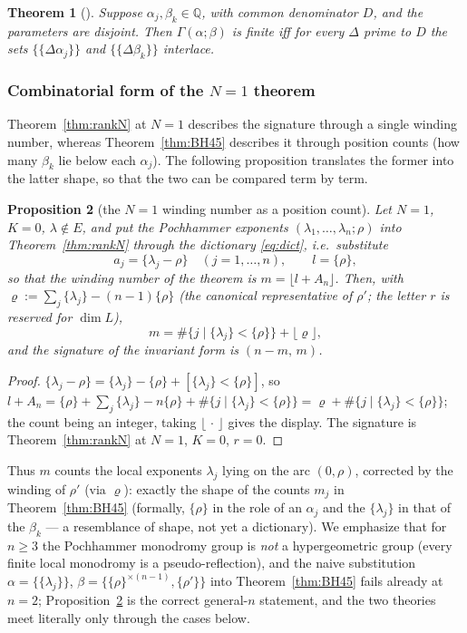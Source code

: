 \documentclass[11pt]{article}
\newtheorem{theorem}{Theorem}[section]
\newtheorem{proposition}[theorem]{Proposition}
\theoremstyle{definition}
\newcommand{\frc}[1]{\{#1\}}
\begin{document}
\begin{theorem}[{\cite[Thm.~4.8]{BH}}]\label{thm:BH48}
Suppose $\alpha_j,\beta_k\in\mathbb Q$, with common denominator $D$, and the
parameters are disjoint. Then $\Gamma(\alpha;\beta)$ is finite
iff for every $\Delta$ prime to $D$ the sets $\{\frc{\Delta\alpha_j}\}$ and
$\{\frc{\Delta\beta_k}\}$ interlace.
\end{theorem}


\subsubsection{Combinatorial form of the $N=1$ theorem}
Theorem~\ref{thm:rankN} at $N=1$ describes the signature through a
single winding number, whereas Theorem~\ref{thm:BH45} describes it
through position counts (how many $\beta_k$ lie below each
$\alpha_j$). The following proposition translates the former into the
latter shape, so that the two can be compared term by term.

\begin{proposition}[the $N=1$ winding number as a position count]
\label{prop:kappa}
Let $N=1$, $K=0$, $\lambda\notin E$, and put the Pochhammer exponents
$(\lambda_1,\dots,\lambda_n;\rho)$ into Theorem~\ref{thm:rankN}
through the dictionary \eqref{eq:dict}, i.e.\ substitute
\[
a_j=\frc{\lambda_j-\rho}\quad(j=1,\dots,n),\qquad l=\frc\rho ,
\]
so that the winding number of the theorem is $m=\lfloor l+A_n\rfloor$.
Then, with $\varrho:=\sum_j\frc{\lambda_j}-(n-1)\frc{\rho}$ (the
canonical representative of $\rho'$; the letter $r$ is reserved for
$\dim L$),
\[
m=\#\{j\mid\frc{\lambda_j}<\frc{\rho}\}+\lfloor \varrho\rfloor ,
\]
and the signature of the invariant form is $(n-m,\,m)$.
\end{proposition}

\begin{proof}
$\frc{\lambda_j-\rho}=\frc{\lambda_j}-\frc{\rho}+[\frc{\lambda_j}<\frc\rho]$,
so $l+A_n=\frc\rho+\sum_j\frc{\lambda_j}-n\frc\rho
+\#\{j\mid\frc{\lambda_j}<\frc{\rho}\}=\varrho+\#\{j\mid\frc{\lambda_j}<\frc{\rho}\}$;
the count being an integer, taking $\lfloor\,\cdot\,\rfloor$ gives the
display. The signature is Theorem~\ref{thm:rankN} at $N=1$, $K=0$,
$r=0$.
\end{proof}

Thus $m$ counts the local exponents $\lambda_j$ lying on the arc
$(0,\rho)$, corrected by the winding of $\rho'$ (via $\varrho$):
exactly the shape of the counts $m_j$ in Theorem~\ref{thm:BH45}
(formally, $\frc\rho$ in the role of an $\alpha_j$ and the
$\frc{\lambda_j}$ in that of the $\beta_k$ --- a resemblance of shape,
not yet a dictionary). We emphasize that for $n\ge3$ the
Pochhammer monodromy group is \emph{not} a hypergeometric group (every finite
local monodromy is a pseudo-reflection), and the naive substitution
$\alpha=\{\frc{\lambda_j}\}$, $\beta=\{\frc\rho^{\times(n-1)},\frc{\rho'}\}$
into Theorem~\ref{thm:BH45} fails already at $n=2$; Proposition~\ref{prop:kappa}
is the correct general-$n$ statement, and the two theories meet literally only
through the cases below.
\end{document}
